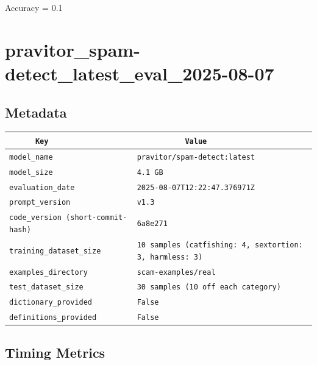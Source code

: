 \documentclass{article}
\begin{document}
\begin{center}
Accuracy = 0.1
\end{center}

\section{pravitor\_spam-detect\_latest\_eval\_2025-08-07}
\subsection{Metadata}

\begin{center}
\begin{tabular}{l | l} \hline
    \verb|      Key      | & \verb|           Value           | \\ \hline
    \hline
    \verb|model_name    | & \verb|pravitor/spam-detect:latest  | \\ \hline
    \verb|model_size    | & \verb|4.1 GB                       | \\ \hline
    \verb|evaluation_date| & \verb|2025-08-07T12:22:47.376971Z  | \\ \hline
    \verb|prompt_version| & \verb|v1.3                         | \\ \hline
    \verb|code_version (short-commit-hash)| & \verb|6a8e271                      | \\ \hline
    \verb|training_dataset_size| & \verb|10 samples (catfishing: 4, sextortion: 3, harmless: 3)| \\ \hline
    \verb|examples_directory| & \verb|scam-examples/real           | \\ \hline
    \verb|test_dataset_size| & \verb|30 samples (10 off each category)| \\ \hline
    \verb|dictionary_provided| & \verb|False                        | \\ \hline
    \verb|definitions_provided| & \verb|False                        | \\ \hline
\end{tabular}
\end{center}

\subsection{Timing Metrics}
\end{document}
